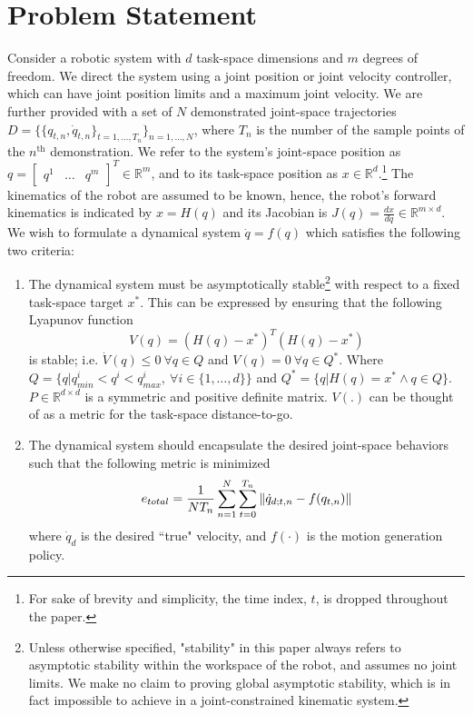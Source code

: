 \documentclass[letterpaper, 10 pt, conference,fleqn]{ieeeconf}
\begin{document}
\section{Problem Statement} \label{Sec:Prob}
Consider a robotic system with $d$ task-space dimensions and $m$ degrees of freedom. We direct the system using a joint position or joint velocity controller, which can have joint position limits and a maximum joint velocity. We are further provided with a set of $N$ demonstrated joint-space trajectories $D=\{\{q_{t,n},\dot{q}_{t,n}\}_{t=1,\dots, T_n}\}_{n=1,\dots,N}$, where $T_n$ is the number of the sample points of the $n^{\text{th}}$ demonstration. We refer to the system's joint-space position as $q=\begin{bmatrix} q^1 & \dots & q^m
\end{bmatrix}^T \in \mathbb{R}^m$, and to its task-space position as $x\in \mathbb{R}^d$.\footnote{For sake of brevity and simplicity, the time index, $t$, is dropped throughout the paper. } The kinematics of the robot are assumed to be known, hence, the robot's forward kinematics is indicated by $x = H(q)$ and its Jacobian is $J(q) = \frac{dx}{dq}\in \mathbb{R}^{m\times d}$.\\
We wish to formulate a dynamical system $\dot{q} = f(q)$ which satisfies the following two criteria:
\renewcommand{\labelenumi}{(\Roman{enumi})}
\begin{enumerate}
\item The dynamical system must be asymptotically stable\footnote{Unless otherwise specified, "stability" in this paper always refers to asymptotic stability within the workspace of the robot, and assumes no joint limits. We make no claim to proving global asymptotic stability, which is in fact impossible to achieve in a joint-constrained kinematic system.} with respect to a fixed task-space target $x^*$. This can be expressed by ensuring that the following Lyapunov function
\begin{equation}
V(q) = (H(q) - x^*)^T(H(q) - x^*) 
\label{eq:Lyp}
\end{equation}
is stable; i.e. $\dot{V}(q)\leq 0 ~\forall q\in Q$ and $V(q)=0~ \forall q\in Q^*$. Where  $Q=\{q|q^i_{min} < q^i < q^i_{max},~\forall i\in \{1,\dots,d\}\}$ and $Q^*=\{q|H(q)=x^*\wedge q\in Q\}$. $P\in \mathbb{R}^{d\times d} $ is a symmetric and positive definite matrix. $V(.)$ can be thought of as a metric for the task-space distance-to-go.
\item The dynamical system should encapsulate the desired joint-space behaviors such that the following metric is minimized
\begin{equation}
\vspace{-5pt}
e_{total} = \frac{1}{NT_n}\sum_{n=1}^N\sum_{t=0}^{T_n} \left \| \dot{q}_{d; t,n} - f(q_{t,n}) \right \|
\label{eq:optim_error}
\end{equation}
  where $\dot{q}_d$ is the desired ``true" velocity, and $f(\cdot)$ is the motion generation policy.
\end{enumerate}
\end{document}
